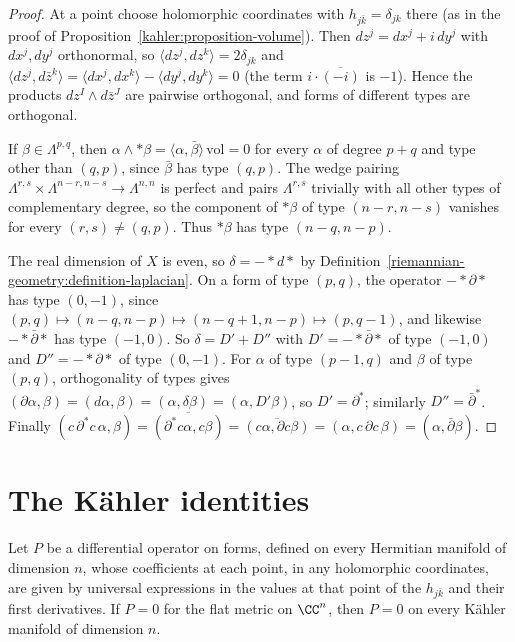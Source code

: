 \begin{proof}
At a point choose holomorphic coordinates with $h_{j\bar k} = \delta_{jk}$ there (as in the proof of
Proposition~\ref{kahler:proposition-volume}). Then $dz^j = dx^j + i\,dy^j$ with $dx^j, dy^j$ orthonormal, so
$\langle dz^j, dz^k\rangle = 2\delta_{jk}$ and $\langle dz^j, d\bar z^k\rangle = \langle dx^j, dx^k\rangle - \langle dy^j, dy^k\rangle = 0$
(the term $i \cdot \overline{(-i)}$ is $-1$). Hence the products $dz^I \wedge d\bar z^J$ are pairwise orthogonal, and forms of different
types are orthogonal.

If $\beta \in \Lambda^{p,q}$, then $\alpha \wedge *\beta = \langle\alpha, \bar\beta\rangle\,\mathrm{vol} = 0$ for every $\alpha$ of
degree $p + q$ and type other than $(q,p)$, since $\bar\beta$ has type $(q,p)$. The wedge pairing
$\Lambda^{r,s} \times \Lambda^{n-r,n-s} \to \Lambda^{n,n}$ is perfect and pairs $\Lambda^{r,s}$ trivially with all other types of
complementary degree, so the component of $*\beta$ of type $(n-r, n-s)$ vanishes for every $(r,s) \neq (q,p)$. Thus $*\beta$ has type
$(n-q, n-p)$.

The real dimension of $X$ is even, so $\delta = -*d*$ by Definition~\ref{riemannian-geometry:definition-laplacian}. On a form of type
$(p,q)$, the operator $-*\partial*$ has type $(0, -1)$, since $(p,q) \mapsto (n-q, n-p) \mapsto (n-q+1, n-p) \mapsto (p, q-1)$, and
likewise $-*\bar\partial*$ has type $(-1, 0)$. So $\delta = D' + D''$ with $D' = -*\bar\partial*$ of type $(-1,0)$ and $D'' = -*\partial*$
of type $(0,-1)$. For $\alpha$ of type $(p-1, q)$ and $\beta$ of type $(p,q)$, orthogonality of types gives
$(\partial\alpha, \beta) = (d\alpha, \beta) = (\alpha, \delta\beta) = (\alpha, D'\beta)$, so $D' = \partial^*$; similarly $D'' = \bar\partial^*$.
Finally $(c\,\partial^*c\,\alpha, \beta) = \overline{(\partial^*c\alpha, c\beta)} = \overline{(c\alpha, \partial c\beta)} = (\alpha, c\,\partial c\,\beta) = (\alpha, \bar\partial\beta)$.
\end{proof}

\section{The K\"ahler identities}\label{kahler:section-kahler-identities}

\begin{lemma}\label{kahler:lemma-osculation-principle}
Let $P$ be a differential operator on forms, defined on every Hermitian manifold of dimension $n$, whose coefficients at each point, in
any holomorphic coordinates, are given by universal expressions in the values at that point of the $h_{j\bar k}$ and their first
derivatives. If $P = 0$ for the flat metric on $\CC^n$, then $P = 0$ on every K\"ahler manifold of dimension $n$.
\end{lemma}

